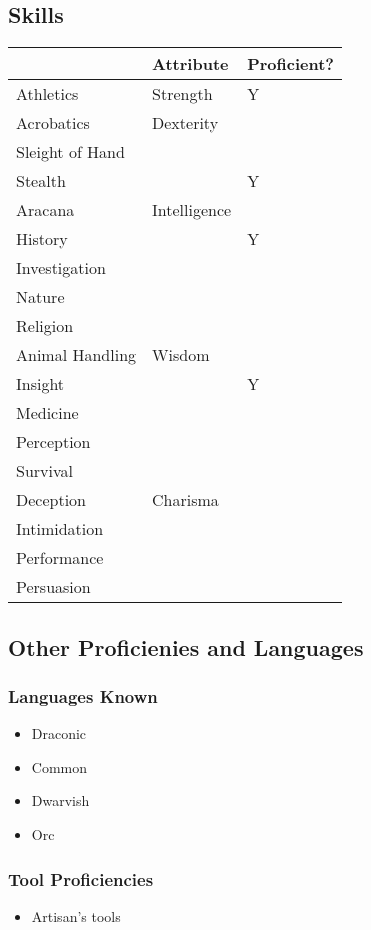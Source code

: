 \documentclass[11pt]{article}
\begin{document}
\subsection{Skills}
\label{sec:org74124f1}
\begin{center}
\label{tab:org2d5aeb1}
\begin{tabular}{lll}
 & Attribute & Proficient?\\
\hline
Athletics & Strength & Y\\
\hline
Acrobatics & Dexterity & \\
Sleight of Hand &  & \\
Stealth &  & Y\\
\hline
Aracana & Intelligence & \\
History &  & Y\\
Investigation &  & \\
Nature &  & \\
Religion &  & \\
\hline
Animal Handling & Wisdom & \\
Insight &  & Y\\
Medicine &  & \\
Perception &  & \\
Survival &  & \\
\hline
Deception & Charisma & \\
Intimidation &  & \\
Performance &  & \\
Persuasion &  & \\
\end{tabular}
\end{center}

\subsection{Other Proficienies and Languages}
\label{sec:orgc4abab6}

\subsubsection{Languages Known}
\label{sec:org63ec1cc}
\begin{itemize}
\item Draconic
\item Common
\item Dwarvish
\item Orc
\end{itemize}

\subsubsection{Tool Proficiencies}
\label{sec:orgd99d9f1}
\begin{itemize}
\item Artisan's tools
\end{itemize}
\end{document}
